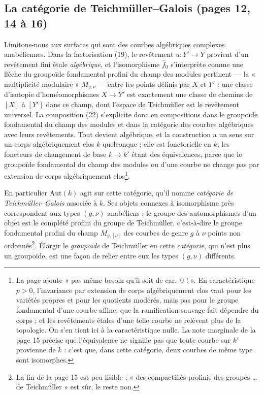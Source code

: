 \documentclass[11pt,a4paper]{article}
\begin{document}
\subsection*{La catégorie de Teichmüller–Galois (pages 12, 14 à 16)}

Limitons-nous aux surfaces qui sont des courbes algébriques complexes
anabéliennes. Dans la factorisation (19), le revêtement $u : Y' \to Y$ provient
d'un revêtement fini étale \emph{algébrique}, et l'isomorphisme $\hat f_0$
s'interprète comme une flèche du groupoïde fondamental profini du champ des
modules pertinent — la « multiplicité modulaire » $M_{g,\nu}$ — entre les
points définis par $X$ et $Y'$ : une classe d'isotopie d'homéomorphismes
$X \to Y'$ est exactement une classe de chemins de $[X]$ à $[Y']$ dans ce
champ, dont l'espace de Teichmüller est le revêtement universel. La
composition (22) s'explicite donc en compositions dans le groupoïde
fondamental du champ des modules et dans la catégorie des courbes algébriques
avec leurs revêtements. Tout devient algébrique, et la construction a un sens
sur un corps algébriquement clos $k$ quelconque ; elle est fonctorielle en $k$,
les foncteurs de changement de base $k \to k'$ étant des équivalences, parce
que le groupoïde fondamental du champ des modules ou d'une courbe ne change pas
par extension de corps algébriquement clos\footnote{La page ajoute « pas même besoin qu'il soit de car.~0 ! ». En caractéristique $p > 0$, l'invariance par
extension de corps algébriquement clos vaut pour les variétés propres et pour
les quotients modérés, mais pas pour le groupe fondamental d'une courbe
affine, que la ramification sauvage fait dépendre du corps ; et les
revêtements étales d'une telle courbe ne relèvent plus de la topologie. On
s'en tient ici à la caractéristique nulle. La note marginale de la page 15
précise que l'équivalence ne signifie pas que toute courbe sur $k'$ provienne
de $k$ : c'est que, dans cette catégorie, deux courbes de même type sont
isomorphes.}.

En particulier $\mathrm{Aut}(k)$ agit sur cette catégorie, qu'il nomme
\emph{catégorie de Teichmüller–Galois} associée à $k$. Ses objets connexes à
isomorphisme près correspondent aux types $(g, \nu)$ anabéliens ; le groupe
des automorphismes d'un objet est le complété profini du groupe de
Teichmüller, c'est-à-dire le groupe fondamental profini du champ
$M_{g,[\nu]}$ des courbes de genre $g$ à $\nu$ points non ordonnés\footnote{La
fin de la page 15 est peu lisible ; « des compactifiés profinis des groupes
… de Teichmüller » est sûr, le reste non.}. Élargir le \emph{groupoïde} de
Teichmüller en cette \emph{catégorie}, qui n'est plus un groupoïde, est une
façon de relier entre eux les types $(g, \nu)$ différents.
\end{document}
